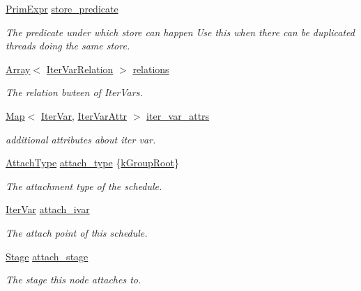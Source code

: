 \begin{DoxyCompactItemize}
\hyperlink{classtvm_1_1PrimExpr}{Prim\+Expr} \hyperlink{classtvm_1_1te_1_1StageNode_a8f4ba7f2931b3541c12734af511600a7}{store\+\_\+predicate}
\begin{DoxyCompactList}\small\item\em The predicate under which store can happen Use this when there can be duplicated threads doing the same store. \end{DoxyCompactList}\item 
\hyperlink{classtvm_1_1Array}{Array}$<$ \hyperlink{classtvm_1_1te_1_1IterVarRelation}{Iter\+Var\+Relation} $>$ \hyperlink{classtvm_1_1te_1_1StageNode_ad1c0f8dc1f0f406a2abcd05fdad8fad5}{relations}
\begin{DoxyCompactList}\small\item\em The relation bwteen of Iter\+Vars. \end{DoxyCompactList}\item 
\hyperlink{classtvm_1_1Map}{Map}$<$ \hyperlink{classtvm_1_1tir_1_1IterVar}{Iter\+Var}, \hyperlink{classtvm_1_1te_1_1IterVarAttr}{Iter\+Var\+Attr} $>$ \hyperlink{classtvm_1_1te_1_1StageNode_a1d1f5c5e99f0c0c5d09a497b5c05443f}{iter\+\_\+var\+\_\+attrs}
\begin{DoxyCompactList}\small\item\em additional attributes about iter var. \end{DoxyCompactList}\item 
\hyperlink{namespacetvm_1_1te_a7693a274748dadfa2eaa35f5ce9008a5}{Attach\+Type} \hyperlink{classtvm_1_1te_1_1StageNode_a1e77f0ad8149a5aabaa8a98907ff3bed}{attach\+\_\+type} \{\hyperlink{namespacetvm_1_1te_a7693a274748dadfa2eaa35f5ce9008a5aac738a0b856206b6347a1f4899f31bfa}{k\+Group\+Root}\}
\begin{DoxyCompactList}\small\item\em The attachment type of the schedule. \end{DoxyCompactList}\item 
\hyperlink{classtvm_1_1tir_1_1IterVar}{Iter\+Var} \hyperlink{classtvm_1_1te_1_1StageNode_ad8a1f14b199103ecf22e7bf021eff8d4}{attach\+\_\+ivar}
\begin{DoxyCompactList}\small\item\em The attach point of this schedule. \end{DoxyCompactList}\item 
\hyperlink{classtvm_1_1te_1_1Stage}{Stage} \hyperlink{classtvm_1_1te_1_1StageNode_a75c8cf7d913a913e34abcaf6797540a5}{attach\+\_\+stage}
\begin{DoxyCompactList}\small\item\em The stage this node attaches to. \end{DoxyCompactList}\item 

\end{DoxyCompactItemize}

